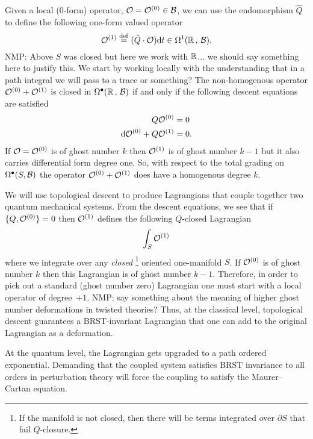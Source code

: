 \documentclass[11pt]{amsart}
\def\natalie#1{{\textcolor{green!65!black}{NMP: {#1}}}}
\begin{document}
Given a local (0-form) operator, $\mathcal O = \mathcal O^{(0)} \in \mathcal B$, we can use the endomorphism $\hat{Q}$ to define the following one-form valued operator
\[
\mathcal O^{(1)} \overset{\rm def}{=} (\hat{Q} \cdot \mathcal O) {\rm d} t \in \Omega^1(\mathbb R \, , \, \mathcal B).
\]
\natalie{Above $S$ was closed but here we work with $\mathbb R$... we should say something here to justify this. We start by working locally with the understanding that in a path integral we will pass to a trace or something?}
The non-homogenous operator $\mathcal O^{(0)} + \mathcal O^{(1)}$ is closed in $\Omega^\bullet(\mathbb R \, , \, \mathcal B)$ if and only if the following descent equations are satisfied 
\begin{align*}
Q \mathcal O^{(0)} & = 0 \\
{\rm d} \mathcal O^{(0)} + Q \mathcal O^{(1)} & = 0 .
\end{align*}
If $\mathcal O = \mathcal O^{(0)}$ is of ghost number $k$ then $\mathcal O^{(1)}$ is of ghost number $k-1$ but it also carries differential form degree one. 
So, with respect to the total grading on $\Omega^\bullet(S, \mathcal B)$ the operator $\mathcal O^{(0)} + \mathcal O^{(1)}$ does have a homogenous degree $k$.

We will use topological descent to produce Lagrangians that couple together two quantum mechanical systems. 
From the descent equations, we see that if $\{Q,\mathcal O^{(0)}\} = 0$ then $\mathcal O^{(1)}$ defines the following $Q$-closed Lagrangian
\[
\int_S \mathcal O^{(1)} 
\]
where we integrate over any \textit{closed} \footnote{If the manifold is not closed, then there will be terms integrated over $\partial S$ that fail $Q$-closure.} oriented one-manifold $S$.
If $\mathcal O^{(0)}$ is of ghost number $k$ then this Lagrangian is of ghost number $k-1$. 
Therefore, in order to pick out a standard (ghost number zero) Lagrangian one must start with a local operator of degree~$+1$. \natalie{say something about the meaning of higher ghost number deformations in twisted theories?}
Thus, at the classical level, topological descent guarantees a BRST-invariant Lagrangian that one can add to the original Lagrangian as a deformation. 

At the quantum level, the Lagrangian gets upgraded to a path ordered exponential. Demanding that the coupled system satisfies BRST invariance to all orders in perturbation theory will force the coupling to satisfy the Maurer--Cartan equation.
\end{document}

